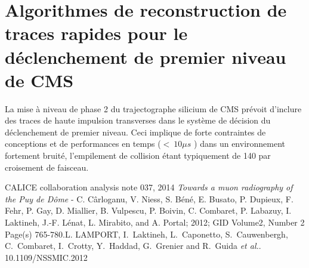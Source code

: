 \documentclass[9pt,french]{article}
\begin{document}
\section*{Algorithmes de reconstruction de traces rapides pour le d\'eclenchement de premier niveau de CMS} 

La mise \`a niveau  de phase 2 du trajectographe silicium de CMS pr\'evoit d'inclure des traces de haute impulsion transverses dans le syst\`eme de d\'ecision du d\'eclenchement de premier niveau. Ceci implique de forte contraintes de conceptions et de performances en temps ($< ~ 10 \mu s$ ) dans un environnement fortement bruit\'e, l'empilement de collision \'etant typiquement de 140 par croisement de faisceau.  
\begin{thebibliography}{2}
    CALICE collaboration analysis note 037, 2014 
    {\it Towards a muon radiography of the Puy de Dôme} - C. Cârloganu, V. Niess, S. Béné, E. Busato, P. Dupieux, F. Fehr, P. Gay, D. Miallier, B. Vulpescu, P. Boivin, C. Combaret, P. Labazuy, I. Laktineh, J.-F. Lénat, L. Mirabito, and A. Portal; 2012; GID Volume2, Number 2 Page(s) 765-780.L. LAMPORT, 
  I.~Laktineh, L.~Caponetto, S.~Cauwenbergh, C.~Combaret, I.~Crotty, Y.~Haddad, G.~Grenier and R.~Guida {\it et al.}. 10.1109/NSSMIC.2012

\end{thebibliography}
\end{document}
